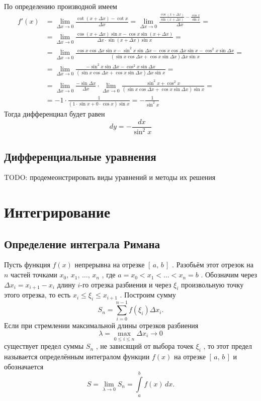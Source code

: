 \documentclass[12pt]{article}
\begin{document}
\begin{enumerate}
	По определению производной имеем
	\[
	\begin{aligned}
		f'(x) &= \lim_{\Delta x \to 0}\frac{\cot{(x + \Delta x)} - \cot{x}}{\Delta x} = \lim_{\Delta x \to 0}\frac{\frac{\cos{(x + \Delta x)}}{\sin{(x + \Delta x)}} - \frac{\cos{x}}{\sin{x}}}{\Delta x} = \\
			  &= \lim_{\Delta x \to 0}\frac{\cos{(x + \Delta x)}\sin{x} - \cos{x}\sin{(x + \Delta x)}}{\Delta x \cdot \sin{(x + \Delta x)}\sin{x}} = \\
			  &= \lim_{\Delta x \to 0}\frac{\cos x\cos\Delta x\sin x - \sin^2 x\sin\Delta x - \cos x\cos\Delta x\sin x - \cos^2 x\sin\Delta x}{(\sin x\cos\Delta x + \cos x\sin\Delta x)\Delta x\sin x} = \\
			  &= \lim_{\Delta x \to 0}\frac{-\sin^2 x\sin\Delta x - \cos^2 x\sin\Delta x}{(\sin x\cos\Delta x + \cos x\sin\Delta x)\Delta x\sin x} = \\
			  &= \lim_{\Delta x \to 0}\frac{-\sin\Delta x}{\Delta x} \cdot \lim_{\Delta x \to 0}\frac{\sin^2 x + \cos^2 x}{(\sin x\cos\Delta x + \cos x\sin\Delta x)\sin x} = \\
			  &= -1 \cdot \frac{1}{(1\cdot\sin x + 0\cdot\cos x)\sin x} = -\frac{1}{\sin^2 x}
	\end{aligned}
	\]
	Тогда дифференциал будет равен
	\[
		dy = - \dfrac{dx}{\sin^2{x}}
	\]
\end{enumerate}

\subsection{\hywenhei Дифференциальные уравнения}

TODO: продемеонстрировать виды уравнений и методы их решения

\section{\hywenhei Интегрирование}

\subsection{\hywenhei Определение интеграла Римана}

Пусть функция $f(x)$ непрерывна на отрезке $[\,a,\, b\,]$ . Разобьём этот отрезок на $n$ частей 
точками $x_0,\, x_1,\, \ldots,\, x_n$ , где $a = x_0 < x_1 < \ldots < x_n = b$ . Обозначим через 
$\Delta x_i = x_{i + 1} - x_i$ длину $i$-го отрезка разбиения и через
$\xi_i$ произвольную точку этого отрезка, то есть $x_i \leq \xi_i \leq x_{i + 1}$ . Построим 
сумму 
\[S_n = \sum_{i=0}^{n-1} f(\xi_i) \Delta x_i.\]
Если при стремлении максимальной длины отрезков разбиения
\[\lambda = \max_{0 \leq i \leq n} \Delta x_i \to 0\]
существует предел суммы $S_n$ , не зависящий от выбора точек $\xi_i$ , то этот предел называется 
определённым интегралом функции $f(x)$ на отрезке $[\,a,\, b\,]$ и обозначается
\[S = \lim_{\lambda \to 0} S_n = \int\limits_a^b f(x) \, dx.\]
\end{document}
